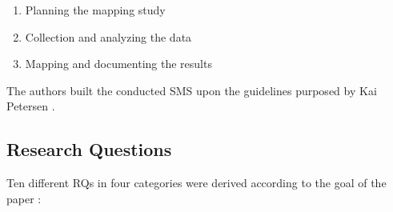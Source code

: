 \begin{enumerate}
    \item Planning the mapping study
    \item Collection and analyzing the data
    \item Mapping and documenting the results
\end{enumerate}

The authors built the conducted SMS upon the guidelines purposed by Kai Petersen \cite{petersen:SMS}.

\subsection{Research Questions}

Ten different RQs in four categories were derived
according to the goal of the paper \cite{waseem:SMSMSADevOps}:

